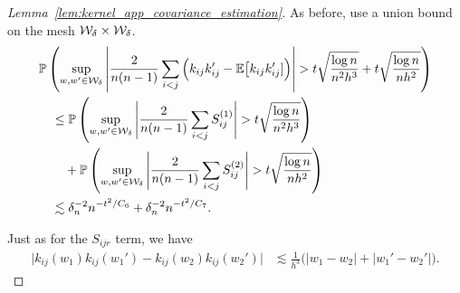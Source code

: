 \begin{proof}[Lemma~\ref{lem:kernel_app_covariance_estimation}]

  As before, use a union bound
  on the mesh $\mathcal{W}_\delta \times \mathcal{W}_\delta$.
  \begin{align*}
    &\mathbb{P}\left(
      \sup_{w,w' \in \mathcal{W}_\delta}
      \left|
      \frac{2}{n(n-1)}
      \sum_{i<j}
      \Big(
        k_{i j} k_{i j}'
        - \mathbb{E}\big[k_{i j} k_{i j}']
      \Big)
      \right|
      > t \sqrt{\frac{\log n}{n^2h^3}}
      + t \sqrt{\frac{\log n}{n h^2}}
    \right) \\
    &\quad\leq
    \mathbb{P}\left(
      \sup_{w,w' \in \mathcal{W}_\delta}
      \Bigg|
      \frac{2}{n(n-1)}
      \sum_{i<j}
      S_{i j}^{(1)}
      \Bigg|
      > t
      \sqrt{\frac{\log n}{n^2h^3}}
    \right) \\
    &\qquad+
    \mathbb{P}\left(
      \sup_{w,w' \in \mathcal{W}_\delta}
      \Bigg|
      \frac{2}{n(n-1)}
      \sum_{i<j}
      S_{i j}^{(2)}
      \Bigg|
      > t
      \sqrt{\frac{\log n}{n h^2}}
    \right) \\
    &\quad\lesssim
    \delta_n^{-2} n^{-t^2 / C_6}
    + \delta_n^{-2} n^{-t^2 / C_7}.
  \end{align*}


  Just as for the $S_{i j r}$ term,
  we have
  \begin{align*}
    \big|
    k_{i j}(w_1)
    k_{i j}(w_1')
    - k_{i j}(w_2)
    k_{i j}(w_2')
    \big|
    &\lesssim
    \frac{1}{h^3}
    \Big(
      |w_1 - w_2|
      + |w_1' - w_2'|
    \Big).
  \end{align*}



\end{proof}
